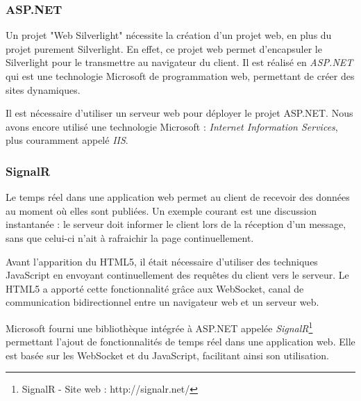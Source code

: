 \subsubsection{ASP.NET}

Un projet "Web Silverlight" nécessite la création d'un projet web, en plus du projet purement Silverlight.
En effet, ce projet web permet d'encapsuler le Silverlight pour le transmettre au navigateur du client.
Il est réalisé en \textit{ASP.NET} qui est une technologie Microsoft de programmation web, permettant de créer des sites dynamiques.

Il est nécessaire d'utiliser un serveur web pour déployer le projet ASP.NET.
Nous avons encore utilisé une technologie Microsoft : \textit{Internet Information Services}, plus couramment appelé \textit{IIS}.

\subsubsection{SignalR}

Le temps réel dans une application web permet au client de recevoir des données au moment où elles sont publiées.
Un exemple courant est une discussion instantanée : le serveur doit informer le client lors de la réception d'un message, sans que celui-ci n'ait à rafraichir la page continuellement.

Avant l'apparition du HTML5, il était nécessaire d'utiliser des techniques JavaScript en envoyant continuellement des requêtes du client vers le serveur.
Le HTML5 a apporté cette fonctionnalité grâce aux WebSocket, canal de communication bidirectionnel entre un navigateur web et un serveur web.

Microsoft fourni une bibliothèque intégrée à ASP.NET appelée \textit{SignalR}\footnote{SignalR - Site web : http://signalr.net/} permettant l'ajout de fonctionnalités de temps réel dans une application web.
Elle est basée sur les WebSocket et du JavaScript, facilitant ainsi son utilisation.